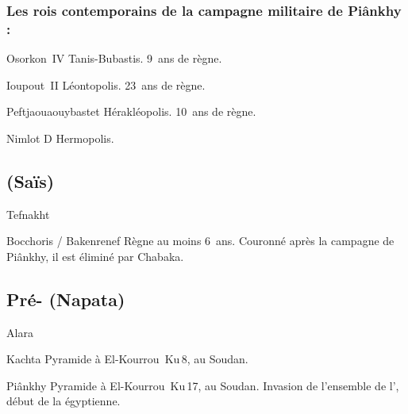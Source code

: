 \subsubsection{Les rois contemporains de la campagne militaire 
               de Piânkhy :}
\begin{listerois}
  \item [Osorkon~IV] Tanis-Bubastis. \num{9}~ans de règne.
  \item [Ioupout~II] Léontopolis. \num{23}~ans de règne.
  \item [Peftjaouaouybastet] Hérakléopolis. \num{10}~ans de règne.
  \item [Nimlot D] Hermopolis.
\end{listerois}

\subsection{\texorpdfstring{}{XXIVe dynastie} (Saïs)}

\begin{listerois}
  \item [Tefnakht \datation{(c.~728/7-720)}]
  \item [Bocchoris / Bakenrenef \datation{(c.~\anorange{720}{715})}]
        Règne au moins \num{6}~ans. Couronné après la campagne de 
        Piânkhy, il est éliminé par Chabaka.
\end{listerois}

\subsection{Pré-\texorpdfstring{}{XXVe dynastie} (Napata)}

\begin{listerois}
  \item [Alara \datation{(c.~\anorange{785}{760})}]
  \item [Kachta \datation{(c.~\anorange{760}{750})}] 
        Pyramide à El-Kourrou~Ku\,8, au Soudan.
  \item [Piânkhy \datation{(c.~\anorange{750}{716})}] 
        Pyramide à El-Kourrou~Ku\,17, au Soudan. Invasion de 
        l'ensemble de l'\kmt, début de la  égyptienne.
\end{listerois}

\subsection{\texorpdfstring{}{XXVe dynastie}}

